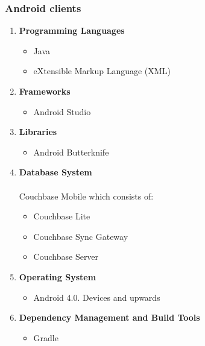 \documentclass{article}
\begin{document}
		\subsubsection{Android clients}
		\begin{enumerate}
			 \item \textbf{Programming Languages}
			\begin{itemize}
				\item Java
				\item eXtensible Markup Language (XML)
			\end{itemize}
		\item \textbf{Frameworks}
			\begin{itemize}
				\item Android Studio
			\end{itemize}
		\item \textbf{Libraries}
			\begin{itemize}
				\item Android Butterknife
			\end{itemize}
		\item \textbf{Database System} \\ \\ 
		Couchbase Mobile which consists of:
			\begin{itemize}
 				\item Couchbase Lite
				\item Couchbase Sync Gateway
				\item Couchbase Server
			\end{itemize}
			\item \textbf{Operating System}
		\begin{itemize}
 				\item Android 4.0. Devices and upwards
			\end{itemize}
		\item \textbf{Dependency Management and Build Tools}
			\begin{itemize}
				\item Gradle
			\end{itemize}
		\end{enumerate}
	
\end{document}

